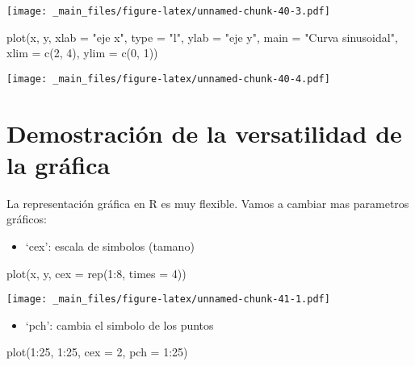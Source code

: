 \documentclass[
]{book}
\newenvironment{Shaded}{\begin{snugshade}}{\end{snugshade}}
\newcommand{\AttributeTok}[1]{\textcolor[rgb]{0.77,0.63,0.00}{#1}}
\newcommand{\DecValTok}[1]{\textcolor[rgb]{0.00,0.00,0.81}{#1}}
\newcommand{\FunctionTok}[1]{\textcolor[rgb]{0.00,0.00,0.00}{#1}}
\newcommand{\NormalTok}[1]{#1}
\newcommand{\SpecialCharTok}[1]{\textcolor[rgb]{0.00,0.00,0.00}{#1}}
\newcommand{\StringTok}[1]{\textcolor[rgb]{0.31,0.60,0.02}{#1}}
\providecommand{\tightlist}{%
  \setlength{\itemsep}{0pt}\setlength{\parskip}{0pt}}
\begin{document}
\texttt{[image: \_main\_files/figure-latex/unnamed-chunk-40-3.pdf]}

\begin{Shaded}
\begin{Highlighting}[]
\FunctionTok{plot}\NormalTok{(x, y, }\AttributeTok{xlab =} \StringTok{"eje x"}\NormalTok{, }\AttributeTok{type =} \StringTok{"l"}\NormalTok{, }\AttributeTok{ylab =} \StringTok{"eje y"}\NormalTok{, }\AttributeTok{main =} \StringTok{"Curva sinusoidal"}\NormalTok{, }
     \AttributeTok{xlim =} \FunctionTok{c}\NormalTok{(}\DecValTok{2}\NormalTok{, }\DecValTok{4}\NormalTok{), }\AttributeTok{ylim =} \FunctionTok{c}\NormalTok{(}\DecValTok{0}\NormalTok{, }\DecValTok{1}\NormalTok{))}
\end{Highlighting}
\end{Shaded}

\texttt{[image: \_main\_files/figure-latex/unnamed-chunk-40-4.pdf]}

\hypertarget{demostraciuxf3n-de-la-versatilidad-de-la-gruxe1fica}{%
\section{Demostración de la versatilidad de la gráfica}\label{demostraciuxf3n-de-la-versatilidad-de-la-gruxe1fica}}

La representación gráfica en R es muy flexible. Vamos a cambiar mas parametros gráficos:

\begin{itemize}
\tightlist
\item
  `cex': escala de simbolos (tamano)
\end{itemize}

\begin{Shaded}
\begin{Highlighting}[]
\FunctionTok{plot}\NormalTok{(x, y, }\AttributeTok{cex =} \FunctionTok{rep}\NormalTok{(}\DecValTok{1}\SpecialCharTok{:}\DecValTok{8}\NormalTok{, }\AttributeTok{times =} \DecValTok{4}\NormalTok{))}
\end{Highlighting}
\end{Shaded}

\texttt{[image: \_main\_files/figure-latex/unnamed-chunk-41-1.pdf]}

\begin{itemize}
\tightlist
\item
  `pch': cambia el simbolo de los puntos
\end{itemize}

\begin{Shaded}
\begin{Highlighting}[]
\FunctionTok{plot}\NormalTok{(}\DecValTok{1}\SpecialCharTok{:}\DecValTok{25}\NormalTok{, }\DecValTok{1}\SpecialCharTok{:}\DecValTok{25}\NormalTok{, }\AttributeTok{cex =} \DecValTok{2}\NormalTok{, }\AttributeTok{pch =} \DecValTok{1}\SpecialCharTok{:}\DecValTok{25}\NormalTok{)}
\end{Highlighting}
\end{Shaded}
\end{document}

